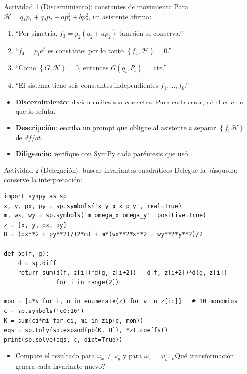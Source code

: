 \documentclass[spanish]{beamer}
\newcommand{\Ham}{\mathcal{H}}
\newcommand{\pb}[2]{\left\{#1,#2\right\}}   %
\begin{document}
\begin{frame}{Actividad 1 (Discernimiento): constantes de movimiento}
Para $\Ham = q_1p_1 + q_2p_2 + ap_1^2 + bp_2^2$, un asistente afirma:
\begin{enumerate}
  \item[(a)] ``Por simetría, $f_3 = p_2(q_2 + ap_2)$ también se conserva.''
  \item[(b)] ``$f_4 = p_1e^{t}$ es constante; por lo tanto $\pb{f_4}{\Ham} = 0$.''
  \item[(c)] ``Como $\pb{G}{\Ham} = 0$, entonces $G(q_i,P_i) = $ cte.''
  \item[(d)] ``El sistema tiene seis constantes independientes $f_1,\ldots,f_6$.''
\end{enumerate}
\begin{itemize}
  \item<2-> \textbf{Discernimiento:} decida cuáles son correctas. Para cada error,
        dé el cálculo que lo refuta.
  \item<3-> \textbf{Descripción:} escriba un prompt que obligue al asistente a separar
        $\pb{f}{\Ham}$ de $df/dt$.
  \item<4-> \textbf{Diligencia:} verifique con SymPy cada paréntesis que usó.
\end{itemize}
\end{frame}

\begin{frame}[fragile]{Actividad 2 (Delegación): buscar invariantes cuadráticos}
Delegue la búsqueda; conserve la interpretación:
\footnotesize
\begin{verbatim}
import sympy as sp
x, y, px, py = sp.symbols('x y p_x p_y', real=True)
m, wx, wy = sp.symbols('m omega_x omega_y', positive=True)
z = [x, y, px, py]
H = (px**2 + py**2)/(2*m) + m*(wx**2*x**2 + wy**2*y**2)/2

def pb(f, g):
    d = sp.diff
    return sum(d(f, z[i])*d(g, z[i+2]) - d(f, z[i+2])*d(g, z[i])
               for i in range(2))

mon = [u*v for i, u in enumerate(z) for v in z[i:]]   # 10 monomios
c = sp.symbols('c0:10')
K = sum(ci*mi for ci, mi in zip(c, mon))
eqs = sp.Poly(sp.expand(pb(K, H)), *z).coeffs()
print(sp.solve(eqs, c, dict=True))
\end{verbatim}
\normalsize
\begin{itemize}
  \item Compare el resultado para $\omega_x\neq\omega_y$ y para $\omega_x = \omega_y$.
        ¿Qué transformación genera cada invariante nuevo?
\end{itemize}
\end{frame}
\end{document}
